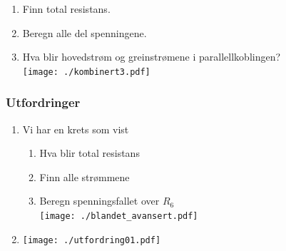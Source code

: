 \documentclass[12pt,a4paper]{article}
\begin{document}
\begin{enumerate}
\begin{enumerate}
\item Finn total resistans.
\item Beregn alle del spenningene. 
\item Hva blir hovedstrøm og greinstrømene i parallellkoblingen?\\
\texttt{[image: ./kombinert3.pdf]}
\end{enumerate}
\end{enumerate}

\subsubsection{Utfordringer}
\begin{enumerate}
\item Vi har en krets som vist

\begin{enumerate}
\item Hva blir total resistans
\item Finn alle strømmene
\item Beregn spenningsfallet over $R_{6}$\\
\texttt{[image: ./blandet\_avansert.pdf]}
\end{enumerate}
\item \texttt{[image: ./utfordring01.pdf]}
\end{enumerate}
\end{document}
